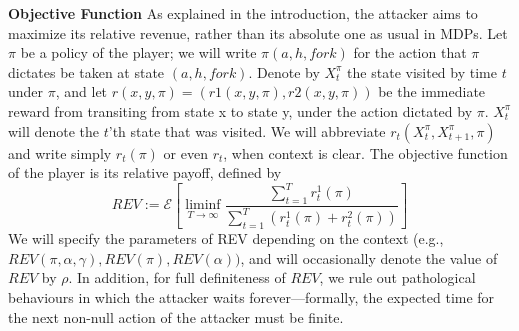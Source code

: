 \textbf{Objective Function}
As explained in the introduction, the attacker aims to maximize its relative revenue, rather than its absolute one as usual in MDPs. Let $\pi$ be a policy of the player; we will write $\pi(a, h, fork)$ for the action that $\pi$ dictates be taken at state $(a, h, fork)$. Denote by $X^{\pi}_t$ the state visited by time $t$ under $\pi$, and let $r(x, y, \pi) = (r1(x, y, \pi), r2(x, y, \pi))$ be the immediate reward from transiting from state x to state y, under the action dictated by $\pi$. $X^{\pi}_t$ will denote the $t$’th state that was visited. We will abbreviate $r_t(X^\pi_t ,X^\pi_{t+1}, \pi)$ and write simply $r_t(\pi)$ or even $r_t$, when context is clear. The objective function of the player is its relative payoff, defined by
$$
    REV := \mathcal{E} \left[ \liminf_{T \rightarrow \infty} \frac{\sum_{t=1}^T r_t^1(\pi)}{\sum_{t=1}^T(r_t^1(\pi)+r_t^2(\pi))} \right]    
$$
We will specify the parameters of REV depending on the context (e.g.,
$REV(\pi, \alpha, \gamma), REV(\pi), REV(\alpha))$, and will occasionally denote the value of $REV$ by $\rho$. In addition, for full definiteness of $REV$, we rule out pathological behaviours in which the attacker waits forever—formally, the expected time for the next non-null action of the attacker must be finite.